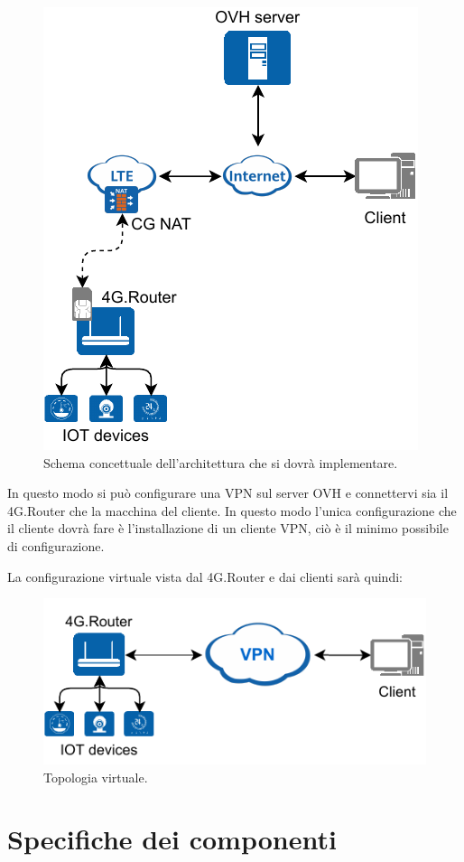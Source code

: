 \begin{figure}[H]
	\centering
	\includegraphics[width=0.5\linewidth]{immagini/diag-real}
	\caption{Schema concettuale dell'architettura che si dovr\`a implementare. \cite{icons}}

	\label{fig:schem_architettura_reale}

\end{figure}

In questo modo si pu\`o configurare una VPN sul server OVH e connettervi sia il 4G.Router che la macchina del cliente. In questo modo l'unica configurazione che il cliente dovr\`a fare \`e l'installazione di un cliente VPN, ci\`o \`e il minimo possibile di configurazione.

La configurazione virtuale vista dal 4G.Router e dai clienti sar\`a quindi:

\begin{figure}[H]
	\centering
	\includegraphics[width=0.5\linewidth]{immagini/diag-virtual}
	\caption{Topologia virtuale. \cite{icons}}

	\label{fig:schema_architettura_virtuale}

\end{figure}

\section{Specifiche dei componenti}

